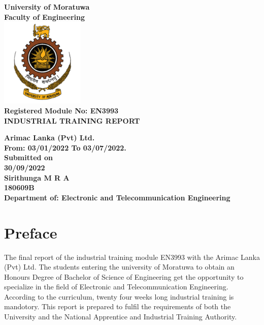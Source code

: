 \documentclass[twoside,12pt,times,onecolumn,a4paper]{report}
\begin{document}
\begin{titlepage}
\pagecolor{lightpink}\afterpage{\nopagecolor}
\center 

\textbf{\Huge University of Moratuwa}\\[1cm]
\textbf{\Large Faculty of Engineering}\\[1cm]

\includegraphics[width=0.3\textwidth]{uomlogo}\\[2cm]

	
\textbf{\Large {Registered Module No: EN3993 }  }\\[1cm]
\textbf{\Large {INDUSTRIAL TRAINING REPORT}}\\[1cm]
\vspace{1cm}

\begin{minipage}{1\textwidth}
	\begin{flushleft}
		\center 
		\textbf{\Large {Arimac Lanka (Pvt) Ltd.}  }\\[1cm]
		\textbf{\Large {From: 03/01/2022 To 03/07/2022.}  }\\[1cm]
		\textbf{\large Submitted on}\\[0.1cm]
		\textbf{\Large 30/09/2022}\\[0.5cm]
		\textbf{\large Sirithunga M R A}\\[0.1cm]
		\textbf{\large 180609B}\\[0.5cm]
		\textbf{\large Department of: Electronic and Telecommunication Engineering}\\[0.5cm]
	\end{flushleft}
\end{minipage}
\hspace{5mm}



\vfill
\end{titlepage}

\chapter{Preface}
\hspace{3em} The final report of the industrial training module EN3993 with the Arimac Lanka (Pvt) Ltd. The students entering the university of Moratuwa to obtain an Honours Degree of Bachelor of Science of Engineering get the opportunity to specialize in the field of Electronic and Telecommunication Engineering. According to the curriculum, twenty four weeks long industrial training is mandotory. This report is prepared to fulfil the requirements of both the University and the National Apprentice and Industrial Training Authority. 
\end{document}
